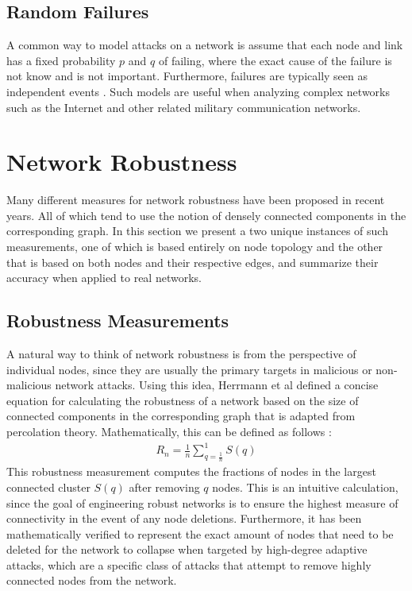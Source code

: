 \documentclass[11pt]{article}
\begin{document}
\subsection{Random Failures}
\label{RandomFailures}
A common way to model attacks on a network is assume that each node and link has a fixed probability $p$ and $q$ of failing, where the exact cause of the failure is not know and is not important. Furthermore, failures are typically seen as independent events \cite{RandomStudy}. Such models are useful when analyzing complex networks such as the Internet and other related military communication networks. 

\section{Network Robustness}

Many different measures for network robustness have been proposed in recent years. All of which tend
to use the notion of densely connected components in the corresponding graph. In this section we present
a two unique instances of such measurements, one of which is based entirely on node topology and the other that is based on both nodes and their respective edges, and summarize their accuracy when applied to real networks.

\subsection{Robustness Measurements}

A natural way to think of network robustness is from the perspective of individual nodes, since they are 
usually the primary targets in malicious or non-malicious network attacks. Using this idea, Herrmann et al
defined a concise equation for calculating the robustness of a network based on the size of connected
components in the corresponding graph that is adapted from percolation theory. Mathematically, this can be defined as follows \cite{Onion}:
\begin{eqnarray*}
R_{n} = \frac{1}{n}\sum_{q=\frac{1}{n}}^{1}S(q)
\end{eqnarray*}
This robustness measurement computes the fractions of nodes in the largest connected cluster $S(q)$ after removing $q$ nodes. This is an intuitive calculation, since the goal of engineering robust networks is to ensure the highest measure of connectivity in the event of any node deletions. Furthermore, it has been mathematically verified to represent the exact amount of nodes that need to be deleted for the network to collapse when targeted by high-degree adaptive attacks, which are a specific class of attacks that attempt to remove highly connected nodes from the network. 
\end{document}
